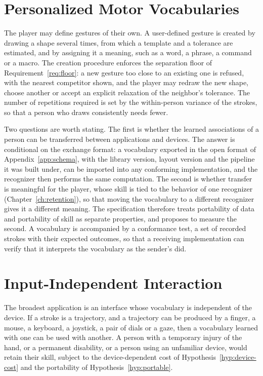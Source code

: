\chapter{Personalized Motor Vocabularies}\label{ch:personalized-vocabularies}

The player may define gestures of their own. A user-defined gesture is created by drawing a shape several times, from which a template and a tolerance are estimated, and by assigning it a meaning, such as a word, a phrase, a command or a macro. The creation procedure enforces the separation floor of Requirement~\ref{req:floor}: a new gesture too close to an existing one is refused, with the nearest competitor shown, and the player may redraw the new shape, choose another or accept an explicit relaxation of the neighbor's tolerance. The number of repetitions required is set by the within-person variance of the strokes, so that a person who draws consistently needs fewer.

Two questions are worth stating. The first is whether the learned associations of a person can be transferred between applications and devices. The answer is conditional on the exchange format: a vocabulary exported in the open format of Appendix~\ref{app:schema}, with the library version, layout version and the pipeline it was built under, can be imported into any conforming implementation, and the recognizer then performs the same computation. The second is whether transfer is meaningful for the player, whose skill is tied to the behavior of one recognizer (Chapter~\ref{ch:retention}), so that moving the vocabulary to a different recognizer gives it a different meaning. The specification therefore treats portability of data and portability of skill as separate properties, and proposes to measure the second. A vocabulary is accompanied by a conformance test, a set of recorded strokes with their expected outcomes, so that a receiving implementation can verify that it interprets the vocabulary as the sender's did.

\chapter{Input-Independent Interaction}\label{ch:input-independent}

The broadest application is an interface whose vocabulary is independent of the device. If a stroke is a trajectory, and a trajectory can be produced by a finger, a mouse, a keyboard, a joystick, a pair of dials or a gaze, then a vocabulary learned with one can be used with another. A person with a temporary injury of the hand, or a permanent disability, or a person using an unfamiliar device, would retain their skill, subject to the device-dependent cost of Hypothesis~\ref{hyp:device-cost} and the portability of Hypothesis~\ref{hyp:portable}.

